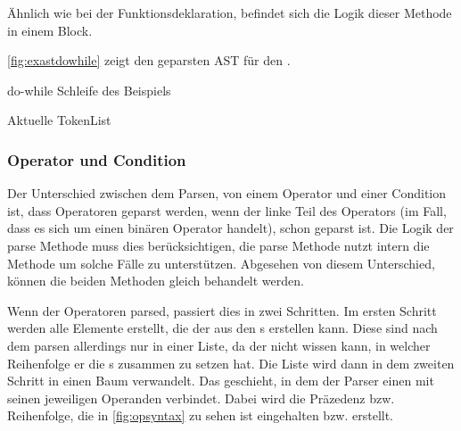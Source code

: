 {      Ähnlich wie bei der Funktionsdeklaration, befindet sich die Logik dieser Methode in einem  Block.

      \autoref{fig:exastdowhile} zeigt den geparsten AST für den .
      \begin{paracol}{2}
        \begin{myCodeEnv}
          \centering
          \begin{myInvBox}[width=.9\linewidth]
            
          \end{myInvBox}
          \caption{do-while Schleife des Beispiels}
          \label{fig:exastdowhile}
        \end{myCodeEnv}
        \switchcolumn
        \begin{myCodeEnv}
          \centering
          \begin{myInvBox}[width=.9\linewidth]
            
          \end{myInvBox}
          \caption*{Aktuelle TokenList}
        \end{myCodeEnv}
      \end{paracol}


    \subsubsection{Operator und Condition}
    \label{sssec:Operator und Condition}
      Der Unterschied zwischen dem Parsen, von einem Operator und einer Condition ist, dass Operatoren geparst werden, wenn der linke Teil des Operators (im Fall, dass es sich um einen binären Operator handelt), schon geparst ist. Die Logik der  parse Methode muss dies berücksichtigen, die  parse Methode nutzt intern die  Methode um solche Fälle zu unterstützen. Abgesehen von diesem Unterschied, können die beiden Methoden gleich behandelt werden.

      Wenn der  Operatoren parsed, passiert dies in zwei Schritten. Im ersten Schritt werden alle  Elemente erstellt, die der  aus den s erstellen kann. Diese sind nach dem parsen allerdings nur in einer Liste, da der  nicht wissen kann, in welcher Reihenfolge er die s zusammen zu setzen hat. Die Liste wird dann in dem zweiten Schritt in einen Baum verwandelt. Das geschieht, in dem der Parser einen  mit seinen jeweiligen Operanden verbindet. Dabei wird die Präzedenz bzw. Reihenfolge, die in \autoref{fig:opsyntax} zu sehen ist eingehalten bzw. erstellt.

}
